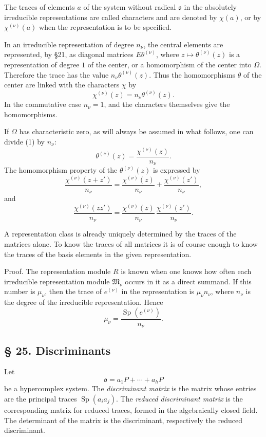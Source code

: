 \documentclass[11pt]{article}
\providecommand{\mM}{\mathfrak{M}}
\providecommand{\mo}{\mathfrak{o}}
\begin{document}
The traces of elements $a$ of the system without radical $\mo$ in the absolutely irreducible representations are called characters and are denoted by $\chi(a)$, or by $\chi^{(\nu)}(a)$ when the representation is to be specified.

In an irreducible representation of degree $n_\nu$, the central elements are represented, by §21, as diagonal matrices $E\theta^{(\nu)}$, where $z\mapsto\theta^{(\nu)}(z)$ is a representation of degree $1$ of the center, or a homomorphism of the center into $\Omega$. Therefore the trace has the value $n_\nu\theta^{(\nu)}(z)$. Thus the homomorphisms $\theta$ of the center are linked with the characters $\chi$ by
\[
        \chi^{(\nu)}(z)=n_\nu\theta^{(\nu)}(z).              \tag{1}
\]
In the commutative case $n_\nu=1$, and the characters themselves give the homomorphisms.

If $\Omega$ has characteristic zero, as will always be assumed in what follows, one can divide (1) by $n_\nu$:
\[
        \theta^{(\nu)}(z)=\frac{\chi^{(\nu)}(z)}{n_\nu}.
\]
The homomorphism property of the $\theta^{(\nu)}(z)$ is expressed by
\[
        \frac{\chi^{(\nu)}(z+z')}{n_\nu}
        =\frac{\chi^{(\nu)}(z)}{n_\nu}
         +\frac{\chi^{(\nu)}(z')}{n_\nu},
\]
and
\[
        \frac{\chi^{(\nu)}(zz')}{n_\nu}
        =\frac{\chi^{(\nu)}(z)}{n_\nu}\,
         \frac{\chi^{(\nu)}(z')}{n_\nu}.
\]

A representation class is already uniquely determined by the traces of the matrices alone. To know the traces of all matrices it is of course enough to know the traces of the basis elements in the given representation.

Proof. The representation module $R$ is known when one knows how often each irreducible representation module $\mM_\nu$ occurs in it as a direct summand. If this number is $\mu_\nu$, then the trace of $e^{(\nu)}$ in the representation is $\mu_\nu n_\nu$, where $n_\nu$ is the degree of the irreducible representation. Hence
\[
        \mu_\nu=\frac{\operatorname{Sp}(e^{(\nu)})}{n_\nu}.
\]

\subsection*{§ 25. Discriminants}
Let
\[
        \mo=a_1P+\cdots+a_hP
\]
be a hypercomplex system. The \emph{discriminant matrix} is the matrix whose entries are the principal traces $\operatorname{Sp}(a_i a_j)$. The \emph{reduced discriminant matrix} is the corresponding matrix for reduced traces, formed in the algebraically closed field. The determinant of the matrix is the discriminant, respectively the reduced discriminant.
\end{document}

